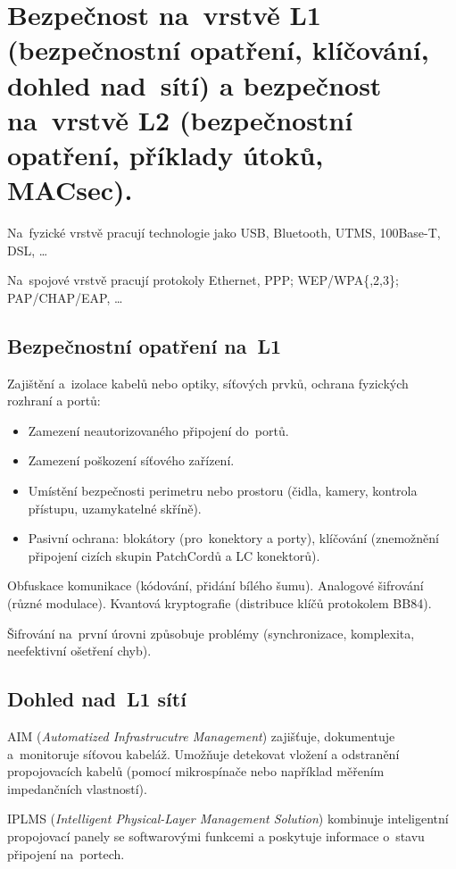 \section{Bezpečnost na~vrstvě L1 (bezpečnostní opatření, klíčování, dohled nad~sítí) a bezpečnost na~vrstvě L2 (bezpečnostní opatření, příklady útoků, MACsec).}

Na~fyzické vrstvě pracují technologie jako USB, Bluetooth, UTMS, 100Base-T, DSL, \dots

Na~spojové vrstvě pracují protokoly Ethernet, PPP; WEP/WPA\{,2,3\}; PAP/CHAP/EAP, \dots


\subsection{Bezpečnostní opatření na~L1}

Zajištění a~izolace kabelů nebo optiky, síťových prvků, ochrana fyzických rozhraní a portů:
\begin{itemize}
	\item Zamezení neautorizovaného připojení do~portů.
	\item Zamezení poškození síťového zařízení.
	\item Umístění bezpečnosti perimetru nebo prostoru (čidla, kamery, kontrola přístupu, uzamykatelné skříně).
	\item Pasivní ochrana: blokátory (pro~konektory a porty), klíčování (znemožnění připojení cizích skupin PatchCordů a LC konektorů).
\end{itemize}

Obfuskace komunikace (kódování, přidání bílého šumu).
Analogové šifrování (různé modulace).
Kvantová kryptografie (distribuce klíčů protokolem BB84).

Šifrování na~první úrovni způsobuje problémy (synchronizace, komplexita, neefektivní ošetření chyb).


\subsection{Dohled nad~L1 sítí}

AIM (\emph{Automatized Infrastrucutre Management}) zajišťuje, dokumentuje a~monitoruje síťovou kabeláž.
Umožňuje detekovat vložení a odstranění propojovacích kabelů (pomocí mikrospínače nebo například měřením impedančních vlastností).

IPLMS (\emph{Intelligent Physical-Layer Management Solution}) kombinuje inteligentní propojovací panely se softwarovými funkcemi a poskytuje informace o~stavu připojení na~portech.


